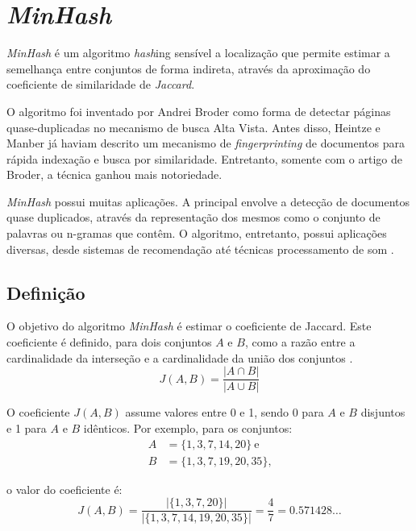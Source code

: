 \section{\emph{MinHash}}\label{sec:minhash}

\emph{MinHash} é um algoritmo \emph{hash}ing sensível a localização que permite estimar a semelhança entre conjuntos de forma indireta, através da aproximação do coeficiente de similaridade de \emph{Jaccard}. 

O algoritmo foi inventado por Andrei Broder \cite{broder1997resemblance} como forma de detectar páginas quase-duplicadas no mecanismo de busca Alta Vista. Antes disso, Heintze \cite{heintze1996scalable} e Manber \cite{manber1994finding} já haviam descrito um mecanismo de \emph{fingerprinting} de documentos para rápida indexação e busca por similaridade.  Entretanto, somente com o artigo de Broder, a técnica ganhou mais notoriedade.

\emph{MinHash} possui muitas aplicações. A principal envolve a detecção de documentos quase duplicados, através da representação dos mesmos como o conjunto de palavras ou n-gramas que contêm. O algoritmo, entretanto, possui aplicações diversas, desde sistemas de recomendação \cite{das2007google} até técnicas processamento de som \cite{chiu2010background,covell2007known}.

\subsection{Definição}

O objetivo do algoritmo \emph{MinHash} é estimar o coeficiente de Jaccard. Este coeficiente é definido, para dois conjuntos $A$ e $B$, como a razão entre a cardinalidade da interseção e a cardinalidade da união dos conjuntos \cite{real1996probabilistic}.
\[
J(A, B) = \frac{| A \cap B |}{| A \cup B|}
\]

O coeficiente $J(A, B)$ assume valores entre 0 e 1, sendo 0 para $A$ e $B$ disjuntos e 1 para $A$ e $B$ idênticos. Por exemplo, para os conjuntos:
\[
\begin{split}
A &= \{1, 3, 7, 14, 20\}\ \text{e} \\
B &= \{1, 3, 7, 19, 20, 35\}\text{,}
\end{split}
\]

o valor do coeficiente é:
\[
J(A, B) = \frac{ |\{1, 3, 7, 20 \}| }{ |\{1, 3, 7, 14, 19, 20, 35\}| } = \frac{4}{7} = 0.571428\dots
\]

